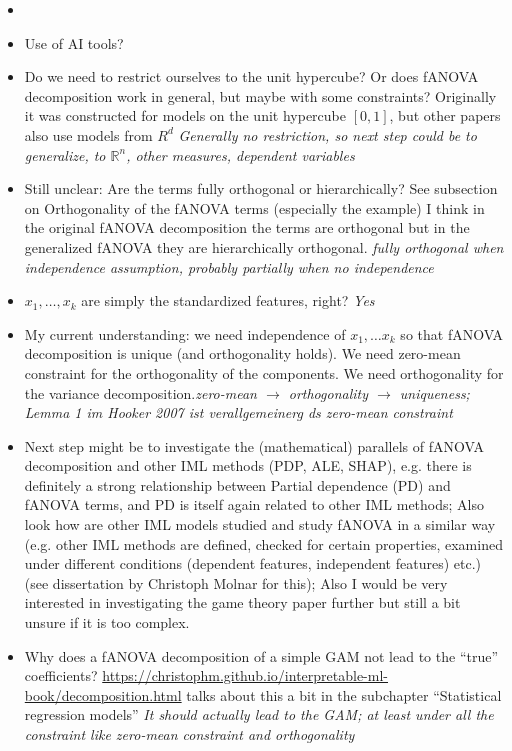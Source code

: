 \begin{itemize}
    \item 
    \item Use of AI tools?
    \item Do we need to restrict ourselves to the unit hypercube? Or does fANOVA decomposition work in general, but maybe with some constraints? Originally it was constructed for models on the unit hypercube $[0,1]$, but other papers also use models from $R^d$ \textit{Generally no restriction, so next step could be to generalize, to $\mathbb{R}^n$, other measures, dependent variables}
    \item Still unclear: Are the terms fully orthogonal or hierarchically? See subsection on Orthogonality of the fANOVA terms (especially the example) I think in the original fANOVA decomposition the terms are orthogonal but in the generalized fANOVA \citep{hooker2007} they are hierarchically orthogonal. \textit{fully orthogonal when independence assumption, probably partially when no independence}
    \item $x_1, \dots, x_k$ are simply the standardized features, right? \textit{Yes}
    \item {\color{orange}My current understanding: we need independence of $x_1, \dots x_k$ so that fANOVA decomposition is unique (and orthogonality holds). We need zero-mean constraint for the orthogonality of the components. We need orthogonality for the variance decomposition.}\textit{zero-mean $\rightarrow$ orthogonality $\rightarrow$ uniqueness; Lemma 1 im Hooker 2007 ist verallgemeinerg ds zero-mean constraint}
    \item Next step might be to investigate the (mathematical) parallels of fANOVA decomposition and other IML methods (PDP, ALE, SHAP), e.g. there is definitely a strong relationship between Partial dependence (PD) and fANOVA terms, and PD is itself again related to other IML methods; Also look how are other IML models studied and study fANOVA in a similar way (e.g. other IML methods are defined, checked for certain properties, examined under different conditions (dependent features, independent features) etc.) (see dissertation by Christoph Molnar for this); Also I would be very interested in investigating the game theory paper further \citep{fumagalli2025} but still a bit unsure if it is too complex.
    \item Why does a fANOVA decomposition of a simple GAM not lead to the ``true'' coefficients? \href{https://christophm.github.io/interpretable-ml-book/decomposition.html}{https://christophm.github.io/interpretable-ml-book/decomposition.html} talks about this a bit in the subchapter ``Statistical regression models'' \textit{It should actually lead to the GAM; at least under all the constraint like zero-mean constraint and orthogonality}

\end{itemize}
